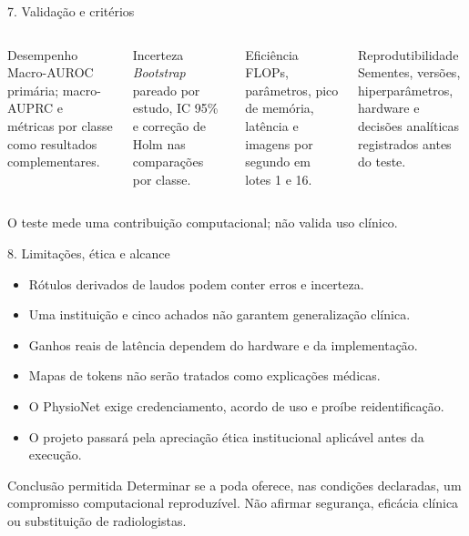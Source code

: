 \documentclass[aspectratio=169,10pt]{beamer}
\begin{document}
\begin{frame}{7. Validação e critérios}
  \begin{columns}[T,onlytextwidth]
      \begin{block}{Desempenho}
        Macro-AUROC primária; macro-AUPRC e métricas por classe como resultados complementares.
      \end{block}
      \begin{block}{Incerteza}
        \emph{Bootstrap} pareado por estudo, IC 95\% e correção de Holm nas comparações por classe.
      \end{block}
      \begin{block}{Eficiência}
        FLOPs, parâmetros, pico de memória, latência e imagens por segundo em lotes 1 e 16.
      \end{block}
      \begin{block}{Reprodutibilidade}
        Sementes, versões, hiperparâmetros, hardware e decisões analíticas registrados antes do teste.
      \end{block}
  \end{columns}
  \vfill
  {\scriptsize O teste mede uma contribuição computacional; não valida uso clínico.}
\end{frame}

\begin{frame}{8. Limitações, ética e alcance}
  \begin{itemize}
    \item Rótulos derivados de laudos podem conter erros e incerteza.
    \item Uma instituição e cinco achados não garantem generalização clínica.
    \item Ganhos reais de latência dependem do hardware e da implementação.
    \item Mapas de tokens não serão tratados como explicações médicas.
    \item O PhysioNet exige credenciamento, acordo de uso e proíbe reidentificação.
    \item O projeto passará pela apreciação ética institucional aplicável antes da execução.
  \end{itemize}
  \vspace{0.7em}
  \begin{block}{Conclusão permitida}
    Determinar se a poda oferece, nas condições declaradas, um compromisso computacional reproduzível. Não afirmar segurança, eficácia clínica ou substituição de radiologistas.
  \end{block}
\end{frame}
\end{document}
